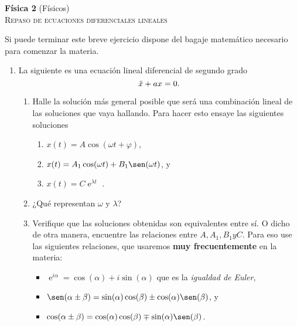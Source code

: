 \documentclass[11pt,spanish,a4paper]{article}
\begin{document}
\begin{center}
\textbf{Física 2} (Físicos) \hfill {}\\
	\textsc{\LARGE Repaso de ecuaciones diferenciales lineales}\\
\end{center}


Si puede terminar este breve ejercicio dispone del bagaje matemático necesario para comenzar la materia.

\begin{enumerate}

\item La siguiente es una ecuación lineal diferencial de segundo grado
\[
	\ddot{x} + a x = 0. \notag
\]
\begin{enumerate}
	\item	Halle la solución más general posible que será una combinación lineal de las soluciones que vaya hallando.
	Para hacer esto ensaye las siguientes soluciones
	\begin{enumerate}
		\item \( x(t) = A \cos(\omega t + \varphi ) \),
		\item \( x(t) = A_1 \cos( \omega t) + B_1 \sen(\omega t) \), y
		\item \( x(t) = C \operatorname{e}^{\lambda t} \) .
	\end{enumerate}
	\item ¿Qué representan \(\omega\) y \(\lambda\)?
	\item Verifique que las soluciones obtenidas son equivalentes entre sí.
	O dicho de otra manera, encuentre las relaciones entre \(A, A_1, B_1 y C\).
	Para eso use las siguientes relaciones, que usaremos \textbf{muy frecuentemente} en la materia:
	\begin{itemize}
		\item \(\operatorname{e}^{i \alpha}= \cos(\alpha) + i \sin(\alpha) \) que es la \textit{igualdad de Euler},
		\item \( \sen( \alpha \pm \beta ) = \sin(\alpha) \cos(\beta) \pm \cos(\alpha) \sen(\beta) \), y
		\item \( \cos( \alpha \pm \beta ) = \cos(\alpha) \cos(\beta) \mp \sin(\alpha) \sen(\beta) \).
	\end{itemize}
\end{enumerate}



\end{enumerate}
\end{document}
